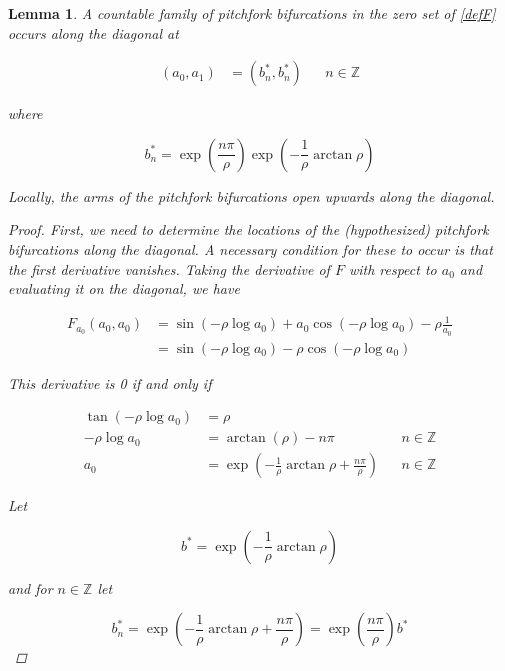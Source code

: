\documentclass[12pt]{article}
\def\Z{{\mathbb Z}}
\newtheorem{lemma}{Lemma}
\begin{document}
\begin{lemma}\label{pitchfork}
A countable family of pitchfork bifurcations in the zero set of \eqref{defF} occurs along the diagonal at 

\begin{align*}
(a_0, a_1) &= (b_n^*, b_n^*) && n \in \Z
\end{align*}

where 

\begin{equation}
b^*_n = \exp\left(\frac{n \pi}{\rho} \right) \exp \left( -\frac{1}{\rho} \arctan \rho \right)
\end{equation}

Locally, the arms of the pitchfork bifurcations open upwards along the diagonal.

\begin{proof}
First, we need to determine the locations of the (hypothesized) pitchfork bifurcations along the diagonal. A necessary condition for these to occur is that the first derivative vanishes. Taking the derivative of $F$ with respect to $a_0$ and evaluating it on the diagonal, we have

\begin{align*}
F_{a_0}(a_0, a_0) &= 
\sin \left( - \rho \log a_0 \right)
+ a_0 \cos \left( - \rho \log a_0 \right)- \rho \frac{1}{a_0} \\
&= \sin \left( - \rho \log a_0 \right) - \rho \cos \left( - \rho \log a_0 \right)
\end{align*}

This derivative is 0 if and only if

\begin{align*}
\tan \left( -\rho \log a_0 \right) &=  \rho \\
-\rho \log a_0 &= \arctan \left( \rho\right) - n \pi && n \in \Z \\ 
a_0 &= \exp \left( -\frac{1}{\rho} \arctan \rho + \frac{n \pi}{\rho} \right) && n \in \Z
\end{align*}

Let 

\begin{equation}
b^* = \exp \left( -\frac{1}{\rho} \arctan \rho \right)
\end{equation}

and for $n \in \Z$ let 

\begin{equation}
b^*_n = \exp \left( -\frac{1}{\rho} \arctan \rho + \frac{n \pi}{\rho} \right) 
= \exp\left(\frac{n \pi}{\rho} \right) b^*
\end{equation}


\end{proof}
\end{lemma}
\end{document}
